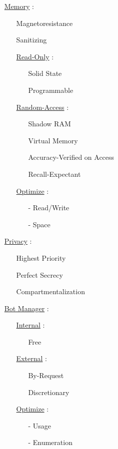 \documentclass[11pt]{article}
\begin{document}
\begin{enumerate}
	\item[] \ul{Memory} :
	\begin{enumerate}
		\item[] Magnetoresistance
		\item[] Sanitizing
		
		\item[] \ul{Read-Only} :
		\begin{enumerate}
			\item[] Solid State
			\item[] Programmable
		\end{enumerate}
	
		\item[] \ul{Random-Access} :
		\begin{enumerate}
			\item[] Shadow RAM
			\item[] Virtual Memory
			\item[] Accuracy-Verified on Access
			\item[] Recall-Expectant
		\end{enumerate}
		
		\item[] \ul{Optimize}  :
		\begin{enumerate}
			\item[-] Read/Write
			\item[-] Space
		\end{enumerate}
	\end{enumerate}

	\item[] \ul{Privacy} :
	\begin{enumerate}
		\item[] Highest Priority
		\item[] Perfect Secrecy
		\item[] Compartmentalization
	\end{enumerate}
	
	\item[] \ul{Bot Manager} :
	\begin{enumerate}
		\item[] \ul{Internal}  :
		\begin{enumerate}
			\item[] Free
		\end{enumerate}
	
		\item[] \ul{External} :
		\begin{enumerate}
			\item[] By-Request
			\item[] Discretionary
		\end{enumerate}

		\item[] \ul{Optimize}  :
		\begin{enumerate}
			\item[-] Usage
			\item[-] Enumeration
		\end{enumerate}
	\end{enumerate}
\end{enumerate}
\end{document}
